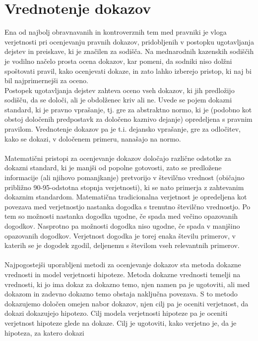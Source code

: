 \documentclass[12pt,a4paper]{amsart}
\theoremstyle{definition} %
\theoremstyle{plain} %
\begin{document}
\section{Vrednotenje dokazov}
Ena od najbolj obravnavanih in kontroverznih tem med pravniki je vloga verjetnosti pri ocenjevanju pravnih dokazov, pridobljenih v postopku 
ugotavljanja dejstev in preiskave, ki je značilen za sodišča. Na mednarodnih kazenskih sodiščih je vodilno načelo prosta ocena dokazov, kar pomeni, 
da sodniki niso dolžni spoštovati pravil, kako ocenjevati dokaze, in zato lahko izberejo pristop, ki naj bi bil najprimernejši za oceno.\\
Postopek ugotavljanja dejstev zahteva oceno vseh dokazov, ki jih predložijo sodišču, da se določi, ali je obdolženec kriv 
ali ne. Uvede se pojem dokazni standard, ki je pravno vprašanje, tj. gre za abstraktno normo, ki je (podobno kot obstoj določenih predpostavk za 
določeno kaznivo dejanje) opredeljena s pravnim pravilom. Vrednotenje dokazov pa je t.i. dejansko vprašanje, gre za odločitev, kako se dokazi, v določenem 
primeru, nanašajo na normo. \\\\
Matematični pristopi za ocenjevanje dokazov določajo različne odstotke za dokazni standard, ki je manjši od popolne gotovosti, zato se 
predložene informacije (ali njihovo pomanjkanje) pretvorijo v številčno vrednost (običajno približno 90-95-odstotna stopnja verjetnosti), ki se nato 
primerja z zahtevanim dokaznim standardom. Matematična tradicionalna verjetnost je opredeljena kot povezava med verjetnostjo 
nastanka dogodka s trenutno številčno vrednostjo. Po tem so možnosti nastanka dogodka ugodne, če spada med večino opazovanih dogodkov. Nasprotno 
pa možnosti dogodka niso ugodne, če spada v manjšino opazovanih dogodkov. Verjetnost dogodka je torej enaka številu primerov, v katerih se je dogodek 
zgodil, deljenemu s številom vseh relevantnih primerov.\\\\
Najpogostejši uporabljeni metodi za ocenjevanje dokazov sta metoda dokazne vrednosti in model verjetnosti hipoteze. Metoda dokazne vrednosti temelji na vrednosti, ki 
jo ima dokaz za dokazno temo, njen namen pa je ugotoviti, ali med dokazom in zadevno dokazno temo obstaja naključna povezava. S to metodo dokazujemo 
določen omejen nabor dokazov, njen cilj pa je oceniti verjetnost, da dokazi dokazujejo hipotezo. Cilj modela 
verjetnosti hipoteze pa je oceniti verjetnost hipoteze glede na dokaze. Cilj je ugotoviti, kako verjetno je, da je hipoteza, za katero dokazi 
\end{document}

